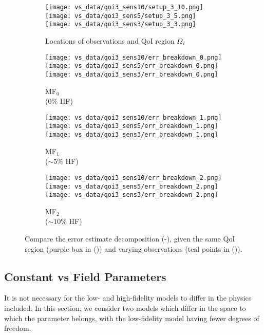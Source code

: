 \begin{figure}
\captionsetup[subfigure]{justification=centering}
\centering
  \begin{subfigure}[t]{0.20\textwidth}
  \centering
    \texttt{[image: vs\_data/qoi3\_sens10/setup\_3\_10.png]}
    \texttt{[image: vs\_data/qoi3\_sens5/setup\_3\_5.png]}
    \texttt{[image: vs\_data/qoi3\_sens3/setup\_3\_3.png]}
    \caption{Locations of observations and QoI region $\Omega_I$}
    \label{subfig:obsSetup2}
  \end{subfigure}
  \begin{subfigure}[t]{0.20\textwidth}
  \centering
    \texttt{[image: vs\_data/qoi3\_sens10/err\_breakdown\_0.png]}
    \texttt{[image: vs\_data/qoi3\_sens5/err\_breakdown\_0.png]}
    \texttt{[image: vs\_data/qoi3\_sens3/err\_breakdown\_0.png]}
    \caption{MF$_0$ \\ ($0\%$ HF)}
    \label{subfig:obsLF2}
  \end{subfigure}
  \begin{subfigure}[t]{0.20\textwidth}
  \centering
    \texttt{[image: vs\_data/qoi3\_sens10/err\_breakdown\_1.png]}
    \texttt{[image: vs\_data/qoi3\_sens5/err\_breakdown\_1.png]}
    \texttt{[image: vs\_data/qoi3\_sens3/err\_breakdown\_1.png]}
    \caption{MF$_1$ \\ ($\sim5\%$ HF)}
  \end{subfigure}
  \begin{subfigure}[t]{0.20\textwidth}
  \centering
    \texttt{[image: vs\_data/qoi3\_sens10/err\_breakdown\_2.png]}
    \texttt{[image: vs\_data/qoi3\_sens5/err\_breakdown\_2.png]}
    \texttt{[image: vs\_data/qoi3\_sens3/err\_breakdown\_2.png]}
    \caption{MF$_2$ \\ ($\sim10\%$ HF)}
    \label{subfig:obsMFlast2}
  \end{subfigure}
  \caption{Compare the error estimate decomposition (-), given the same QoI region (purple box in ()) and varying observations (teal points in ()).}
  \label{fig:dataStudy}
\end{figure}

%
\subsection{Constant vs Field Parameters}
%
It is not necessary for the low- and high-fidelity models to differ in the physics included. In this section, we consider two models which differ in the space to which the parameter belongs, with the low-fidelity model having fewer degrees of freedom.
%
